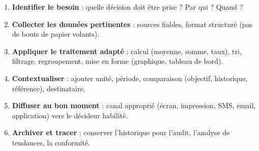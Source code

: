 \documentclass[11pt]{article}
\begin{document}
\begin{methode}
\begin{enumerate}
    \item \textbf{Identifier le besoin} : quelle décision doit être prise ? Par qui ? Quand ?
    \item \textbf{Collecter les données pertinentes} : sources fiables, format structuré (pas de bouts de papier volants).
    \item \textbf{Appliquer le traitement adapté} : calcul (moyenne, somme, taux), tri, filtrage, regroupement, mise en forme (graphique, tableau de bord).
    \item \textbf{Contextualiser} : ajouter unité, période, comparaison (objectif, historique, référence), destinataire.
    \item \textbf{Diffuser au bon moment} : canal approprié (écran, impression, SMS, email, application) vers le décideur habilité.
    \item \textbf{Archiver et tracer} : conserver l'historique pour l'audit, l'analyse de tendances, la conformité.
\end{enumerate}
\end{methode}
\end{document}
